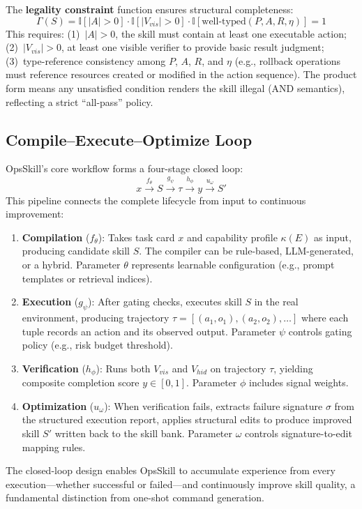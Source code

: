 \documentclass[conference,10pt]{IEEEtran}
\begin{document}
The \textbf{legality constraint} function ensures structural completeness:
\begin{equation}
\Gamma(S) = \mathbb{I}[|A|>0] \cdot \mathbb{I}[|V_{vis}|>0] \cdot \mathbb{I}[\text{well-typed}(P,A,R,\eta)] = 1
\end{equation}
This requires: (1)~$|A|>0$, the skill must contain at least one executable action; (2)~$|V_{vis}|>0$, at least one visible verifier to provide basic result judgment; (3)~type-reference consistency among $P$, $A$, $R$, and $\eta$ (e.g., rollback operations must reference resources created or modified in the action sequence).
The product form means any unsatisfied condition renders the skill illegal (AND semantics), reflecting a strict ``all-pass'' policy.

\subsection{Compile--Execute--Optimize Loop}

OpsSkill's core workflow forms a four-stage closed loop:
\begin{equation}
x \xrightarrow{f_\theta} S \xrightarrow{g_\psi} \tau \xrightarrow{h_\phi} y \xrightarrow{u_\omega} S'
\end{equation}
This pipeline connects the complete lifecycle from input to continuous improvement:
\begin{enumerate}
  \item \textbf{Compilation} ($f_\theta$): Takes task card $x$ and capability profile $\kappa(E)$ as input, producing candidate skill $S$.  The compiler can be rule-based, LLM-generated, or a hybrid.  Parameter $\theta$ represents learnable configuration (e.g., prompt templates or retrieval indices).
  \item \textbf{Execution} ($g_\psi$): After gating checks, executes skill $S$ in the real environment, producing trajectory $\tau = [(a_1, o_1), (a_2, o_2), \ldots]$ where each tuple records an action and its observed output.  Parameter $\psi$ controls gating policy (e.g., risk budget threshold).
  \item \textbf{Verification} ($h_\phi$): Runs both $V_{vis}$ and $V_{hid}$ on trajectory $\tau$, yielding composite completion score $y \in [0, 1]$.  Parameter $\phi$ includes signal weights.
  \item \textbf{Optimization} ($u_\omega$): When verification fails, extracts failure signature $\sigma$ from the structured execution report, applies structural edits to produce improved skill $S'$ written back to the skill bank.  Parameter $\omega$ controls signature-to-edit mapping rules.
\end{enumerate}
The closed-loop design enables OpsSkill to accumulate experience from every execution---whether successful or failed---and continuously improve skill quality, a fundamental distinction from one-shot command generation.
\end{document}
